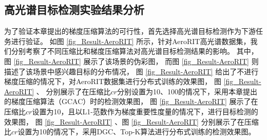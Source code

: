 \documentclass{xdupgthesis}
\begin{document}
\subsection{高光谱目标检测实验结果分析}
为了验证本章提出的梯度压缩算法的可行性，首先选择高光谱目标检测作为下游任务进行验证。
如图 \ref{fig_Result-AeroRIT} 所示，针对AeroRIT高光谱数据集，我们分别考察了不同压缩比和梯度压缩算法对高光谱目标检测结果的影响。
其中，图 \ref{fig_Result-AeroRIT}  展示了该场景的伪彩图，
而图 \ref{fig_Result-AeroRIT}  则描述了该场景中感兴趣目标的分布情况，
图 \ref{fig_Result-AeroRIT}  给出了不进行梯度压缩的情况下，对AeroRIT数据集进行分布式训练的效果图，
图 \ref{fig_Result-AeroRIT} 、
分别展示了在压缩比$cr$分别设置为10、100的情况下，采用本章提出的梯度压缩算法（GCAC）时的检测效果图，
图 \ref{fig_Result-AeroRIT}  展示了在压缩比$cr$设置为10，且以L1-范数作为梯度重要性度量的情况下，进行目标检测的效果图，
图 \ref{fig_Result-AeroRIT}  、图 \ref{fig_Result-AeroRIT}  分别展示了在压缩比$cr$设置为10的情况下，采用DGC、Top-K算法进行分布式训练的检测效果图。
\end{document}
